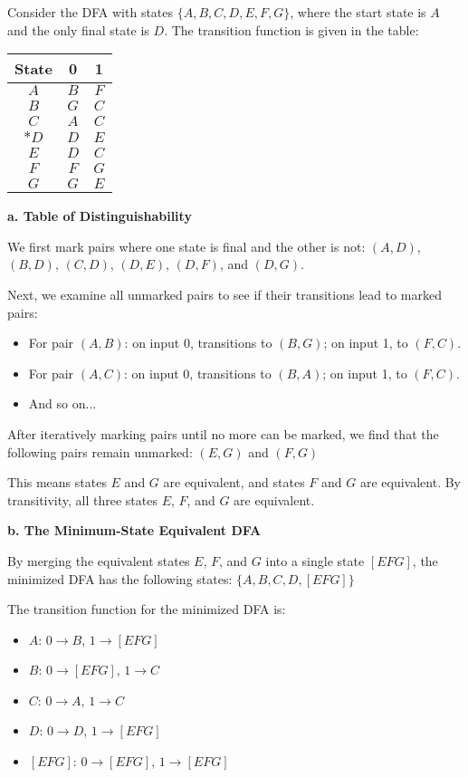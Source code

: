 \documentclass{article}
\theoremstyle{theorem}
\theoremstyle{definition}
\theoremstyle{remark}
\begin{document}
Consider the DFA with states $\{A, B, C, D, E, F, G\}$, where the start state is $A$ and the only final state is $D$. The transition function is given in the table:

\begin{center}
\begin{tabular}{c|cc}
\textbf{State} & \textbf{0} & \textbf{1} \\ \hline
$A$ & $B$ & $F$ \\
$B$ & $G$ & $C$ \\
$C$ & $A$ & $C$ \\
$*D$ & $D$ & $E$ \\
$E$ & $D$ & $C$ \\
$F$ & $F$ & $G$ \\
$G$ & $G$ & $E$ \\
\end{tabular}
\end{center}

\textbf{a. Table of Distinguishability}

We first mark pairs where one state is final and the other is not: $(A,D)$, $(B,D)$, $(C,D)$, $(D,E)$, $(D,F)$, and $(D,G)$.

Next, we examine all unmarked pairs to see if their transitions lead to marked pairs:
\begin{itemize}
    \item For pair $(A,B)$: on input 0, transitions to $(B,G)$; on input 1, to $(F,C)$.
    \item For pair $(A,C)$: on input 0, transitions to $(B,A)$; on input 1, to $(F,C)$.
    \item And so on...
\end{itemize}

After iteratively marking pairs until no more can be marked, we find that the following pairs remain unmarked:
$(E,G)$ and $(F,G)$

This means states $E$ and $G$ are equivalent, and states $F$ and $G$ are equivalent. By transitivity, all three states $E$, $F$, and $G$ are equivalent.

\textbf{b. The Minimum-State Equivalent DFA}

By merging the equivalent states $E$, $F$, and $G$ into a single state $[EFG]$, the minimized DFA has the following states:
$\{A, B, C, D, [EFG]\}$

The transition function for the minimized DFA is:
\begin{itemize}
    \item $A$: $0 \to B$, $1 \to [EFG]$
    \item $B$: $0 \to [EFG]$, $1 \to C$
    \item $C$: $0 \to A$, $1 \to C$
    \item $D$: $0 \to D$, $1 \to [EFG]$
    \item $[EFG]$: $0 \to [EFG]$, $1 \to [EFG]$
\end{itemize}
\end{document}
